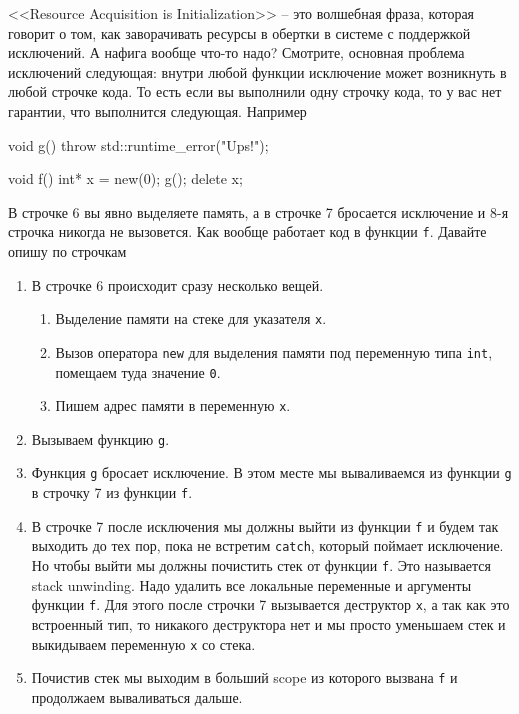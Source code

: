 \documentclass{article}
\begin{document}
<<Resource Acquisition is Initialization>> -- это волшебная фраза, которая говорит о том, как заворачивать ресурсы в обертки в системе с поддержкой исключений. А нафига вообще что-то надо? Смотрите, основная проблема исключений следующая: внутри любой функции исключение может возникнуть в любой строчке кода. То есть если вы выполнили одну строчку кода, то у вас нет гарантии, что выполнится следующая. Например
\begin{cppcode}
void g() {
  throw std::runtime_error("Ups!");
}

void f() {
  int* x = new(0);
  g();
  delete x;
}
\end{cppcode}
В строчке 6 вы явно выделяете память, а в строчке 7 бросается исключение и 8-я строчка никогда не вызовется. Как вообще работает код в функции \verb"f". Давайте опишу по строчкам
\begin{enumerate}
\item В строчке 6 происходит сразу несколько вещей. 
\begin{enumerate}
\item Выделение памяти  на стеке для указателя \verb"x".
\item Вызов оператора \verb"new" для выделения памяти под переменную типа \verb"int", помещаем туда значение \verb"0".
\item Пишем адрес памяти в переменную \verb"x".
\end{enumerate}

\item Вызываем функцию \verb"g".

\item Функция \verb"g" бросает исключение. В этом месте мы вываливаемся из функции \verb"g" в строчку 7 из функции \verb"f".

\item В строчке 7 после исключения мы должны выйти из функции \verb"f" и будем так выходить до тех пор, пока не встретим \verb"catch", который поймает исключение. Но чтобы выйти мы должны почистить стек от функции \verb"f". Это называется stack unwinding. Надо удалить все локальные переменные и аргументы функции \verb"f". Для этого после строчки 7 вызывается деструктор \verb"x", а так как это встроенный тип, то никакого деструктора нет и мы просто уменьшаем стек и выкидываем переменную \verb"x" со стека.

\item Почистив стек мы выходим в больший scope из которого вызвана \verb"f" и продолжаем вываливаться дальше.
\end{enumerate}
\end{document}
